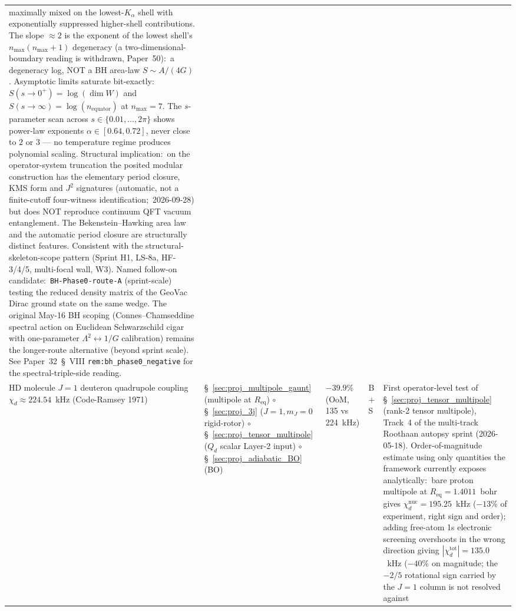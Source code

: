 \documentclass[11pt]{article}
\begin{document}
{\begin{longtable}{p{3.8cm} p{2.5cm} p{1.5cm} p{1.4cm} p{4.5cm}}
maximally mixed on the lowest-$K_\alpha$ shell with exponentially
suppressed higher-shell contributions.  The slope $\approx 2$ is the
exponent of the lowest shell's $n_{\max}(n_{\max}+1)$ degeneracy (a
two-dimensional-boundary reading is withdrawn, Paper~50):\ a degeneracy
log, NOT a BH area-law $S \sim A/(4G)$.  Asymptotic
limits saturate bit-exactly:\ $S(s \to 0^+) = \log(\dim W)$ and
$S(s \to \infty) = \log(n_{\mathrm{equator}})$ at $n_{\max} = 7$.
The $s$-parameter scan across $s \in \{0.01, \dots, 2\pi\}$ shows
power-law exponents $\alpha \in [0.64, 0.72]$, never close to $2$ or
$3$ --- no temperature regime produces polynomial scaling.  Structural
implication:\ on the operator-system truncation the posited
modular construction has the elementary period closure, KMS form and
$J^2$ signatures (automatic, not a finite-cutoff four-witness
identification;\ 2026-09-28) but does NOT reproduce continuum QFT
vacuum entanglement.  The Bekenstein--Hawking area law and the
automatic period closure are structurally distinct features.  Consistent with the structural-skeleton-scope pattern
(Sprint H1, LS-8a, HF-3/4/5, multi-focal wall, W3).  Named follow-on
candidate:\ \texttt{BH-Phase0-route-A} (sprint-scale)
testing the reduced density matrix of the GeoVac Dirac ground state
on the same wedge.  The original May-16 BH scoping (Connes--Chamseddine
spectral action on Euclidean Schwarzschild cigar with one-parameter
$\Lambda^2 \leftrightarrow 1/G$ calibration) remains the longer-route
alternative (beyond sprint scale).  See Paper~32~\S~VIII
\texttt{rem:bh\_phase0\_negative} for the spectral-triple-side reading. \\
HD molecule $J=1$ deuteron quadrupole coupling
$\chi_d \approx 224.54$~kHz (Code-Ramsey 1971) &
\S~\ref{sec:proj_multipole_gaunt} (multipole at $R_\text{eq}$)
$\circ$ \S~\ref{sec:proj_3j} ($J=1, m_J=0$ rigid-rotor)
$\circ$ \S~\ref{sec:proj_tensor_multipole} ($Q_d$ scalar Layer-2 input)
$\circ$ \S~\ref{sec:proj_adiabatic_BO} (BO) &
$-39.9\%$ (OoM, 135 vs 224~kHz) & B$+$S &
First operator-level test of
\S~\ref{sec:proj_tensor_multipole} (rank-2 tensor multipole),
Track~4 of the multi-track Roothaan autopsy sprint (2026-05-18).
Order-of-magnitude estimate using only quantities the framework
currently exposes analytically:\ bare proton multipole at
$R_\text{eq} = 1.4011$~bohr gives $\chi_d^\text{nuc} = 195.25$~kHz
($-13\%$ of experiment, right sign and order); adding free-atom
1s electronic screening overshoots in the wrong direction giving
$|\chi_d^\text{tot}| = 135.0$~kHz ($-40\%$ on magnitude; the $-2/5$
rotational sign carried by the $J{=}1$ column is not resolved against

\end{longtable}}
\end{document}
